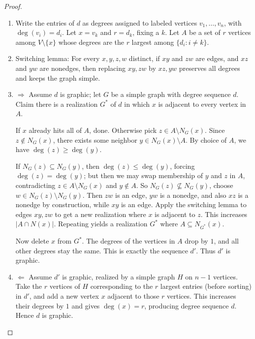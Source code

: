 \documentclass[11pt]{article}
\begin{document}
\begin{proof}
~
\begin{enumerate}
    \item Write the entries of $d$ as degrees assigned to labeled vertices $v_1,\dots,v_n$,
with $\deg(v_i)=d_i$. Let $x=v_k$ and $r=d_k$, fixing a $k$.
Let $A$ be a set of $r$ vertices among $V\setminus\{x\}$ whose degrees are the $r$ largest among
$\{d_i:i\neq k\}$.

\item Switching lemma:
For every $x,y,z,w$ distinct, if $xy$ and $zw$ are edges, and $xz$ and $yw$ are nonedges,
then replacing $xy,zw$ by $xz,yw$ preserves all degrees and keeps the graph simple.

\item $\Rightarrow$ Assume $d$ is graphic; let $G$ be a simple graph with degree sequence $d$.
Claim there is a realization $G^*$ of $d$ in which $x$ is adjacent to every vertex in $A$.

If $x$ already hits all of $A$, done. Otherwise pick $z\in A\setminus N_G(x)$.
Since $z\notin N_G(x)$, there exists some neighbor $y\in N_G(x)\setminus A$.
By choice of $A$, we have $\deg(z)\ge \deg(y)$.

If $N_G(z)\subseteq N_G(y)$, then $\deg(z)\le \deg(y)$, forcing $\deg(z)=\deg(y)$; but then we may swap
membership of $y$ and $z$ in $A$, contradicting $z\in A\setminus N_G(x)$ and $y\notin A$.
So $N_G(z)\not\subseteq N_G(y)$, choose $w\in N_G(z)\setminus N_G(y)$.
Then $zw$ is an edge, $yw$ is a nonedge, and also $xz$ is a nonedge by construction, while $xy$ is an edge.
Apply the switching lemma to edges $xy,zw$ to get a new realization where $x$ is adjacent to $z$.
This increases $|A\cap N(x)|$. Repeating yields a realization $G^*$ where
$A\subseteq N_{G^*}(x)$.

Now delete $x$ from $G^*$. The degrees of the vertices in $A$ drop by $1$, and all other degrees stay the same.
This is exactly the sequence $d'$. Thus $d'$ is graphic.

\item $\Leftarrow$ Assume $d'$ is graphic, realized by a simple graph $H$ on $n-1$ vertices.
Take the $r$ vertices of $H$ corresponding to the $r$ largest entries (before sorting) in $d'$, and add a new vertex
$x$ adjacent to those $r$ vertices. This increases their degrees by $1$ and gives $\deg(x)=r$,
producing degree sequence $d$. Hence $d$ is graphic.
\end{enumerate}
\end{proof}
\end{document}
